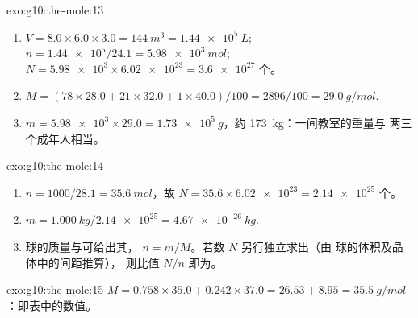 \begin{solution}{exo:g10:the-mole:13}
\begin{enumerate}
  \item $V = 8.0 \times 6.0 \times 3.0 = \qty{144}{m^3} =
        \qty{1.44e5}{L}$; $n = \num{1.44e5} / 24.1 = \qty{5.98e3}{mol}$;
        $N = \num{5.98e3} \times \num{6.02e23} = \num{3.6e27}$ 个。
  \item $M = (78 \times 28.0 + 21 \times 32.0 + 1 \times 40.0) / 100 =
        2896 / 100 = \qty{29.0}{g/mol}$.
  \item $m = \num{5.98e3} \times 29.0 = \qty{1.73e5}{g}$，约
        \qty{173}{kg}：一间教室的重量与
        两三个成年人相当。
\end{enumerate}
\end{solution}

\begin{solution}{exo:g10:the-mole:14}
\begin{enumerate}
  \item $n = 1000 / 28.1 = \qty{35.6}{mol}$，故
        $N = 35.6 \times \num{6.02e23} = \num{2.14e25}$ 个。
  \item $m = \qty{1.000}{kg} / \num{2.14e25} = \qty{4.67e-26}{kg}$.
  \item 球的质量与可给出其，
        $n = m / M$。若数 $N$ 另行独立求出（由
        球的体积及晶体中的间距推算），
        则比值 $N / n$ 即为。
\end{enumerate}
\end{solution}

\begin{solution}{exo:g10:the-mole:15}
$M = 0.758 \times 35.0 + 0.242 \times 37.0 = 26.53 + 8.95 =
\qty{35.5}{g/mol}$：即表中的数值。
\end{solution}

